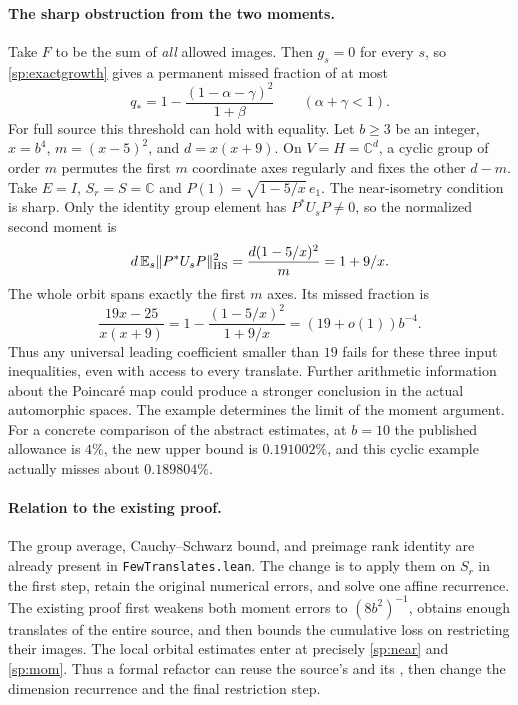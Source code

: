\paragraph{The sharp obstruction from the two moments.}
Take $F$ to be the sum of \emph{all} allowed images. Then $g_s=0$ for
every $s$, so \eqref{sp:exactgrowth} gives a permanent missed fraction of
at most
\[
 q_* = 1-\frac{(1-\alpha-\gamma)^2}{1+\beta}
 \qquad(\alpha+\gamma<1).
\]
For full source this threshold can hold with equality. Let $b\ge3$ be
an integer, $x=b^4$, $m=(x-5)^2$, and $d=x(x+9)$. On $V=H=\mathbb C^d$,
a cyclic group of order $m$ permutes the first $m$ coordinate axes
regularly and fixes the other $d-m$. Take $E=I$, $S_r=S=\mathbb C$
and $P(1)=\sqrt{1-5/x}\,e_1$. The near-isometry condition is sharp.
Only the identity group element has $P^*U_sP\ne0$, so the normalized
second moment is
\[
 d\,\mathbb E_s\|P^*U_sP\|_{\rm HS}^2
       =\frac{d(1-5/x)^2}{m}=1+9/x.
\]
The whole orbit spans exactly the first $m$ axes. Its missed fraction is
\[
 \frac{19x-25}{x(x+9)}
       =1-\frac{(1-5/x)^2}{1+9/x}
       =(19+o(1))b^{-4}.
\]
Thus any universal leading coefficient smaller than $19$ fails for these
three input inequalities, even with access to every translate. Further
arithmetic information about the Poincar\'e map could produce a stronger
conclusion in the actual automorphic spaces. The example determines the
limit of the moment argument. For a concrete comparison of the abstract estimates, at $b=10$ the published allowance is $4\%$, the new upper bound is $0.191002\%$, and this cyclic example actually misses about $0.189804\%$.

\paragraph{Relation to the existing proof.}
The group average, Cauchy--Schwarz bound, and preimage rank identity are
already present in \texttt{FewTranslates.lean}. The change is to apply
them on $S_r$ in the first step, retain the original numerical errors,
and solve one affine recurrence. The existing proof first weakens both
moment errors to $(8b^2)^{-1}$, obtains enough translates of the entire
source, and then bounds the cumulative loss on restricting their images.
The local orbital estimates enter at precisely \eqref{sp:near} and \eqref{sp:mom}. Thus a formal refactor can reuse the source's  and its , then change the dimension recurrence and the final restriction step.

